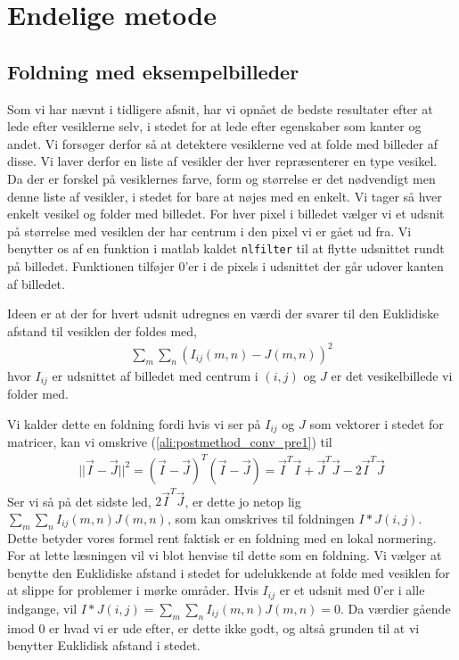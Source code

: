 \section{Endelige metode}
\subsection{Foldning med eksempelbilleder}
Som vi har nævnt i tidligere afsnit, har vi opnået de bedste resultater efter at lede efter vesiklerne selv, i stedet for at lede efter egenskaber som kanter og andet. Vi forsøger derfor så at detektere vesiklerne ved at folde med billeder af disse. Vi laver derfor en liste af vesikler der hver repræsenterer en type vesikel. Da der er forskel på vesiklernes farve, form og størrelse er det nødvendigt men denne liste af vesikler, i stedet for bare at nøjes med en enkelt. Vi tager så hver enkelt vesikel og folder med billedet. For hver pixel i billedet vælger vi et udsnit på størrelse med vesiklen der har centrum i den pixel vi er gået ud fra. Vi benytter os af en funktion i matlab kaldet \texttt{nlfilter} til at flytte udsnittet rundt på billedet. Funktionen tilføjer 0'er i de pixels i udsnittet der går udover kanten af billedet.

Ideen er at der for hvert udsnit udregnes en værdi der svarer til den Euklidiske afstand til vesiklen der foldes med,
\begin{align}
	\sum_m\sum_n\left(I_{ij}(m,n)-J(m,n)\right)^2\label{ali:postmethod_conv_pre1}
\end{align}
hvor $I_{ij}$ er udsnittet af billedet med centrum i $(i,j)$ og $J$ er det vesikelbillede vi folder med. 

Vi kalder dette en foldning fordi hvis vi ser på $I_{ij}$ og $J$ som vektorer i stedet for matricer, kan vi omskrive (\ref{ali:postmethod_conv_pre1}) til
\begin{align}
	||\vec{I}-\vec{J}||^2 = (\vec{I}-\vec{J})^T(\vec{I}-\vec{J}) = \vec{I}^T\vec{I} + \vec{J}^T\vec{J}-2\vec{I}^T\vec{J}
\end{align}
Ser vi så på det sidste led, $2\vec{I}^T\vec{J}$, er dette jo netop lig $\sum_m\sum_nI_{ij}(m,n)J(m,n)$, som kan omskrives til foldningen $I*J(i,j)$. Dette betyder vores formel rent faktisk er en foldning med en lokal normering. For at lette læsningen vil vi blot henvise til dette som en foldning. Vi vælger at benytte den Euklidiske afstand i stedet for udelukkende at folde med vesiklen for at slippe for problemer i mørke områder. Hvis $I_{ij}$ er et udsnit med 0'er i alle indgange, vil $I*J(i,j)=\sum_m\sum_nI_{ij}(m,n)J(m,n)=0$. Da værdier gående imod 0 er hvad vi er ude efter, er dette ikke godt, og altså grunden til at vi benytter Euklidisk afstand i stedet.

